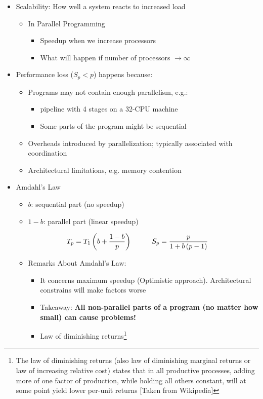 \documentclass[a4paper]{article}
\begin{document}
\begin{itemize}
\item Scalability: How well a system reacts to increased load 
\begin{itemize}
\item In Parallel Programming
\begin{itemize}
\item Speedup when we increase processors
\item What will happen if number of processors $\to\infty$
\end{itemize}
\end{itemize}
\item Performance loss ($S_p<p$) happens because:
\begin{itemize}
\item Programs may not contain enough parallelism, e.g.:
\begin{itemize}
\item pipeline with 4 stages on a 32-CPU machine
\item Some parts of the program might be sequential
\end{itemize}
\item Overheads introduced by parallelization; typically associated with coordination
\item Architectural limitations, e.g. memory contention
\end{itemize}
\item Amdahl's Law
\begin{itemize}
\item $b$: sequential part (no speedup)
\item $1-b$: parallel part (linear speedup)
\end{itemize}
\[{T_p} = {T_1}\left( {b + \frac{{1 - b}}{p}} \right)\hspace{10mm}{S_p} = \frac{p}{{1 + b\left( {p - 1} \right)}}\]
\begin{itemize}
\item Remarks About Amdahl's Law:
\begin{itemize}
\item It concerns maximum speedup (Optimistic approach). Architectural constrains will make factors worse
\item Takeaway: \textbf{All non-parallel parts of a program (no matter how small) can cause problems!}
\item Law of diminishing returns\footnote{The law of diminishing returns (also law of diminishing marginal returns or law of increasing relative cost) states that in all productive processes, adding more of one factor of production, while holding all others constant, will at some point yield lower per-unit returns [Taken from Wikipedia]}

\end{itemize}
\end{itemize}
\end{itemize}
\end{document}
